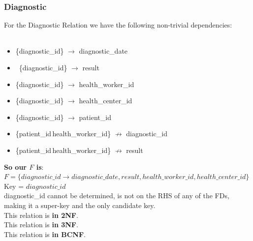 \documentclass{article}
\begin{document}
\subsubsection{Diagnostic}
For the Diagnostic Relation we have the following non-trivial dependencies:\\
\\
\begin{minipage}{\textwidth}
\begin{itemize}
    \item  \{diagnostic\_id\}   $\rightarrow$ diagnostic\_date
    \item\ \{diagnostic\_id\}   $\rightarrow$ result
    \item  \{diagnostic\_id\}   $\rightarrow$ health\_worker\_id
    \item  \{diagnostic\_id\}   $\rightarrow$ health\_center\_id\
    \item  \{diagnostic\_id\}   $\rightarrow$ patient\_id
    \item  \{patient\_id\,health\_worker\_id\} $\not \rightarrow$ diagnostic\_id
    \item  \{patient\_id\,health\_worker\_id\} $\not \rightarrow$ result
\end{itemize}
\end{minipage}

\begin{tcolorbox}
\textbf{So our $F$ is}:
$F = \{diagnostic\_id \rightarrow diagnostic\_date, result, health\_worker\_id, health\_center\_id\}$\\
Key = $diagnostic\_id$\\
diagnostic\_id cannot be determined, is not on the RHS of any of the FDs, making it a super-key and the only candidate key.\\
This relation is \textbf{in 2NF}.\\
This relation is \textbf{in 3NF}.\\
This relation is \textbf{in BCNF}.
\end{tcolorbox}
\end{document}
